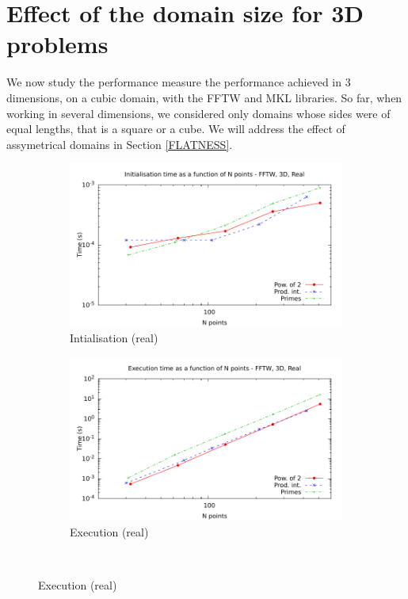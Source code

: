 \documentclass[12pt, a4paper]{article}
\begin{document}
\section{Effect of the domain size for 3D problems}\label{PERFORMANCE3D}
We now study the performance measure the performance achieved in 3 dimensions, on a cubic domain, with  the FFTW and MKL libraries. So far, when working in several dimensions, we considered only domains whose sides were of equal lengths, that is a square or a cube. We will address the effect of assymetrical domains in Section \ref{FLATNESS}. 
\
\begin{figure}[H]
\captionsetup{width=0.8\linewidth}
\centering
\begin{subfigure}{.5\textwidth}
\centering
\includegraphics[width=.9\linewidth]{graphs/3d-fftw-init-r.pdf}
\caption{Intialisation (real)}
\label{3DFFTWRI}
\end{subfigure}%
\begin{subfigure}{.5\textwidth}
\centering
\includegraphics[width=.9\linewidth]{graphs/3d-fftw-exec-r.pdf}
\caption{Execution (real)}
\label{3DFFTWR}
\end{subfigure}\\

\end{figure}
\end{document}
